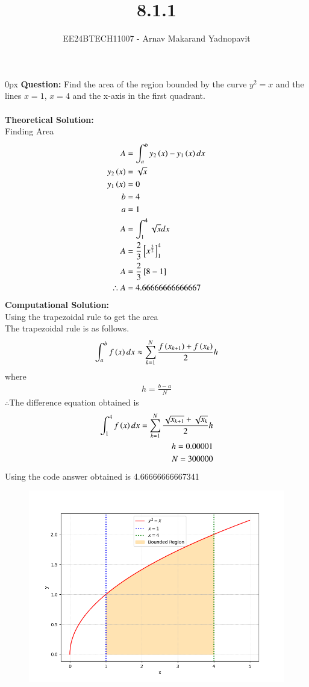 \documentclass[journal,12pt,onecolumn]{IEEEtran}
\theoremstyle{remark}
\begin{document}
\title{8.1.1}
\author{EE24BTECH11007 - Arnav Makarand Yadnopavit}
\maketitle
\renewcommand{\thefigure}{\theenumi}
\renewcommand{\thetable}{\theenumi}
\parindent 0px \textbf{Question:} Find the area of the region bounded by the curve $y^2=x$ and the lines $x=1$, $x=4$ and the x-axis in the first quadrant.\\
\solution\\
\textbf{Theoretical Solution:}\\
Finding Area
\begin{align}
    A&=\int^{b}_{a}y_2\left(x\right)-y_1\left(x\right)dx\\
    y_2\left(x\right)&=\sqrt{x}\\
    y_1\left(x\right)&=0\\
    b&=4\\
    a&=1\\
    A&=\int^{4}_{1}\sqrt{x}dx\\
    A&=\frac{2}{3}{}\left[x^{\frac{3}{2}}\right]^4_1\\
    A&=\frac{2}{3}{}\left[8-1\right]\\
    \therefore A&=4.66666666666667
\end{align}
\textbf{Computational Solution:}\\
Using the trapezoidal rule to get the area\\
The trapezoidal rule is as follows.
\begin{align}
    \int^{b}_{a} f\left(x\right)dx\approx \sum^{N}_{k=1}\frac{f\left(x_{k+1}\right)+f\left(x_{k}\right)}{2}h
\end{align}
where
\begin{align}
    h=\frac{b-a}{N}
\end{align}
$\therefore$The difference equation obtained is\\
\begin{align}
    \int^{4}_{1} f\left(x\right)dx=\sum^{N}_{k=1}\frac{\sqrt{x_{k+1}}+\sqrt{x_{k}}}{2}h\\
    h=0.00001\\
    N=300000
\end{align}
Using the code answer obtained is 4.66666666667341
\begin{figure}[h]
    \centering
    \includegraphics[width=\columnwidth]{figs/fig.png}
 \end{figure}
\end{document}
